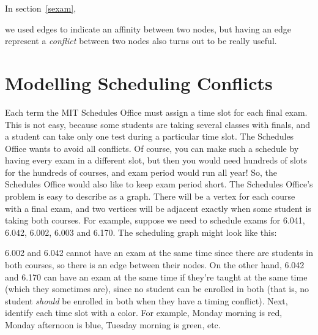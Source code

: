 \begin{problems}
\classproblems
{}

\homeworkproblems
{}
\end{problems}



In section~\ref{sexam},

we used edges to indicate an affinity between two nodes, but having an
edge represent a \emph{conflict} between two nodes also turns out to be
really useful.

\section{Modelling Scheduling Conflicts}

Each term the MIT Schedules Office must assign a time slot for each final
exam.  This is not easy, because some students are taking several classes
with finals, and a student can take only one test during a particular time
slot.  The Schedules Office wants to avoid all conflicts.  Of course, you
can make such a schedule by having every exam in a different slot, but
then you would need hundreds of slots for the hundreds of courses, and
exam period would run all year!  So, the Schedules Office would also like
to keep exam period short.  The Schedules Office's problem is easy to
describe as a graph.  There will be a vertex for each course with a final
exam, and two vertices will be adjacent exactly when some student is
taking both courses.  For example, suppose we need to schedule exams for
6.041, 6.042, 6.002, 6.003 and 6.170.  The scheduling graph might look
like this:


6.002 and 6.042 cannot have an exam at the same time since there are
students in both courses, so there is an edge between their nodes.  On the
other hand, 6.042 and 6.170 can have an exam at the same time if they're
taught at the same time (which they sometimes are), since no student can
be enrolled in both (that is, no student \emph{should} be enrolled in both
when they have a timing conflict).  Next, identify each time slot with a
color.  For example, Monday morning is red, Monday afternoon is blue,
Tuesday morning is green, etc.

